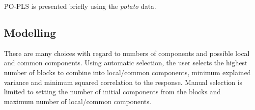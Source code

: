 \documentclass[
]{article}
\newenvironment{Shaded}{\begin{snugshade}}{\end{snugshade}}
\newcommand{\AttributeTok}[1]{\textcolor[rgb]{0.77,0.63,0.00}{#1}}
\newcommand{\CommentTok}[1]{\textcolor[rgb]{0.56,0.35,0.01}{\textit{#1}}}
\newcommand{\DecValTok}[1]{\textcolor[rgb]{0.00,0.00,0.81}{#1}}
\newcommand{\FunctionTok}[1]{\textcolor[rgb]{0.00,0.00,0.00}{#1}}
\newcommand{\NormalTok}[1]{#1}
\newcommand{\OtherTok}[1]{\textcolor[rgb]{0.56,0.35,0.01}{#1}}
\newcommand{\SpecialCharTok}[1]{\textcolor[rgb]{0.00,0.00,0.00}{#1}}
\newcommand{\StringTok}[1]{\textcolor[rgb]{0.31,0.60,0.02}{#1}}
\begin{document}
PO-PLS is presented briefly using the \emph{potato} data.

\hypertarget{modelling-3}{%
\subsection{Modelling}\label{modelling-3}}

There are many choices with regard to numbers of components and possible
local and common components. Using automatic selection, the user selects
the highest number of blocks to combine into local/common components,
minimum explained variance and minimum squared correlation to the
response. Manual selection is limited to setting the number of initial
components from the blocks and maximum number of local/common
components.

\begin{Shaded}
\end{Shaded}
\end{document}
